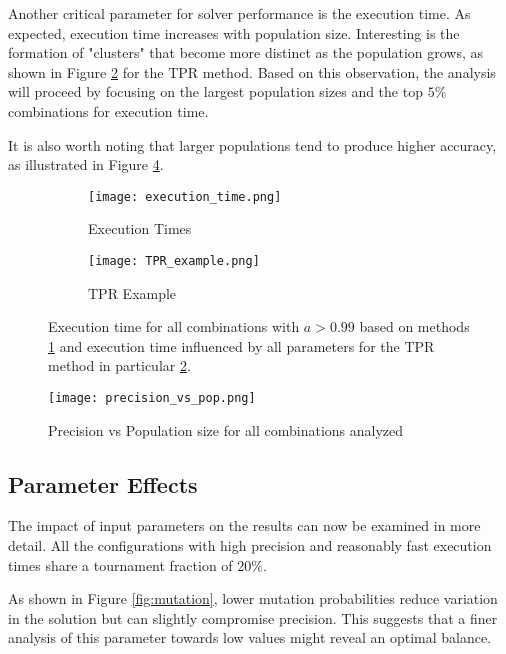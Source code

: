 \documentclass[11pt,a4paper,twoside]{article}
\begin{document}
Another critical parameter for solver performance is the execution time. As expected, execution time increases with population size. Interesting is the formation of "clusters" that become more distinct as the population grows, as shown in Figure \ref{fig:TPR_ex} for the TPR method. Based on this observation, the analysis will proceed by focusing on the largest population sizes and the top $5\%$ combinations for execution time.

It is also worth noting that larger populations tend to produce higher accuracy, as illustrated in Figure \ref{fig:precision}.

\begin{figure}[H]
    \centering
    \begin{subfigure}[b]{0.45\textwidth}
        \centering
        \texttt{[image: execution\_time.png]}
        \caption{Execution Times}
        \label{fig:Pop_sizes}
    \end{subfigure}
    \hfill
    \begin{subfigure}[b]{0.45\textwidth}
        \centering
        \texttt{[image: TPR\_example.png]}
        \caption{TPR Example}
        \label{fig:TPR_ex}
    \end{subfigure}
    \caption{Execution time for all combinations with $a>0.99$ based on methods \ref{fig:Pop_sizes} and execution time influenced by all parameters for the TPR method in particular \ref{fig:TPR_ex}.}
    \label{fig:comparison}
\end{figure}

\begin{figure}[H]
    \centering
    \texttt{[image: precision\_vs\_pop.png]}
    \caption{Precision vs Population size for all combinations analyzed}
    \label{fig:precision}
\end{figure}

\subsection{Parameter Effects}

The impact of input parameters on the results can now be examined in more detail. All the configurations with high precision and reasonably fast execution times share a tournament fraction of $20\%$.

As shown in Figure \ref{fig:mutation}, lower mutation probabilities reduce variation in the solution but can slightly compromise precision. This suggests that a finer analysis of this parameter towards low values might reveal an optimal balance.
\end{document}
